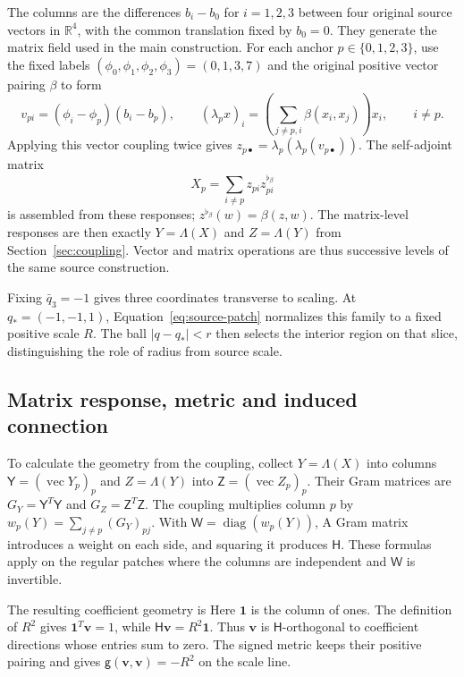 The columns are the differences $b_i-b_0$ for $i=1,2,3$ between four original source vectors in $\mathbb R^4$, with the common translation fixed by $b_0=0$. They generate the matrix field used in the main construction. For each anchor $p\in\{0,1,2,3\}$, use the fixed labels $(\phi_0,\phi_1,\phi_2,\phi_3)=(0,1,3,7)$ and the original positive vector pairing $\beta$ to form
\[
v_{pi}=(\phi_i-\phi_p)(b_i-b_p),\qquad
(\lambda_p x)_i=\left(\sum_{j\ne p,i}\beta(x_i,x_j)\right)x_i,\qquad i\ne p.
\]
Applying this vector coupling twice gives $z_{p\bullet}=\lambda_p(\lambda_p(v_{p\bullet}))$. The self-adjoint matrix
\[
X_p=\sum_{i\ne p}z_{pi}z_{pi}^{\flat_\beta}
\]
is assembled from these responses; $z^{\flat_\beta}(w)=\beta(z,w)$. The matrix-level responses are then exactly $Y=\Lambda(X)$ and $Z=\Lambda(Y)$ from Section~\ref{sec:coupling}. Vector and matrix operations are thus successive levels of the same source construction.

Fixing $\bar q_3=-1$ gives three coordinates transverse to scaling. At $q_*=(-1,-1,1)$,
\SourceReferenceDisplay
Equation~\eqref{eq:source-patch} normalizes this family to a fixed positive scale $R$. The ball $|q-q_*|<r$ then selects the interior region on that slice, distinguishing the role of radius from source scale.

\subsection{Matrix response, metric and induced connection}
\label{app:source-metric}
To calculate the geometry from the coupling, collect $Y=\Lambda(X)$ into columns $\mathsf Y=(\operatorname{vec}Y_p)_p$ and $Z=\Lambda(Y)$ into $\mathsf Z=(\operatorname{vec}Z_p)_p$. Their Gram matrices are $G_Y=\mathsf Y^T\mathsf Y$ and $G_Z=\mathsf Z^T\mathsf Z$. The coupling multiplies column $p$ by $w_p(Y)=\sum_{j\ne p}(G_Y)_{pj}$. With $\mathsf W=\operatorname{diag}(w_p(Y))$,
\SourceGramReductionDisplay
A Gram matrix introduces a weight on each side, and squaring it produces $\mathsf H$. These formulas apply on the regular patches where the columns are independent and $\mathsf W$ is invertible.

The resulting coefficient geometry is
\SourceCoefficientGeometryDisplay
Here $\mathbf1$ is the column of ones. The definition of $R^2$ gives $\mathbf1^T\mathbf v=1$, while $\mathsf H\mathbf v=R^2\mathbf1$. Thus $\mathbf v$ is $\mathsf H$-orthogonal to coefficient directions whose entries sum to zero. The signed metric keeps their positive pairing and gives $\mathsf g(\mathbf v,\mathbf v)=-R^2$ on the scale line.

